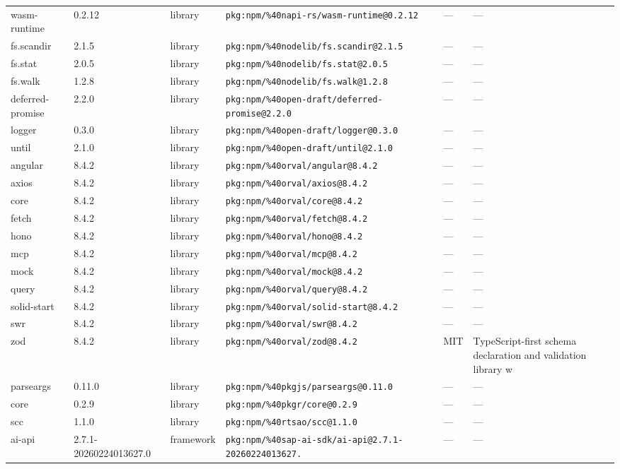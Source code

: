 \documentclass[11pt]{article}
\begin{document}
\begin{longtable}{|l|l|l|p{2.2cm}|l|p{4cm}|}
wasm-runtime & 0.2.12 & library & \texttt{pkg:npm/\%40napi-rs/wasm-runtime@0.2.12} & — & — \\
fs.scandir & 2.1.5 & library & \texttt{pkg:npm/\%40nodelib/fs.scandir@2.1.5} & — & — \\
fs.stat & 2.0.5 & library & \texttt{pkg:npm/\%40nodelib/fs.stat@2.0.5} & — & — \\
fs.walk & 1.2.8 & library & \texttt{pkg:npm/\%40nodelib/fs.walk@1.2.8} & — & — \\
deferred-promise & 2.2.0 & library & \texttt{pkg:npm/\%40open-draft/deferred-promise@2.2.0} & — & — \\
logger & 0.3.0 & library & \texttt{pkg:npm/\%40open-draft/logger@0.3.0} & — & — \\
until & 2.1.0 & library & \texttt{pkg:npm/\%40open-draft/until@2.1.0} & — & — \\
angular & 8.4.2 & library & \texttt{pkg:npm/\%40orval/angular@8.4.2} & — & — \\
axios & 8.4.2 & library & \texttt{pkg:npm/\%40orval/axios@8.4.2} & — & — \\
core & 8.4.2 & library & \texttt{pkg:npm/\%40orval/core@8.4.2} & — & — \\
fetch & 8.4.2 & library & \texttt{pkg:npm/\%40orval/fetch@8.4.2} & — & — \\
hono & 8.4.2 & library & \texttt{pkg:npm/\%40orval/hono@8.4.2} & — & — \\
mcp & 8.4.2 & library & \texttt{pkg:npm/\%40orval/mcp@8.4.2} & — & — \\
mock & 8.4.2 & library & \texttt{pkg:npm/\%40orval/mock@8.4.2} & — & — \\
query & 8.4.2 & library & \texttt{pkg:npm/\%40orval/query@8.4.2} & — & — \\
solid-start & 8.4.2 & library & \texttt{pkg:npm/\%40orval/solid-start@8.4.2} & — & — \\
swr & 8.4.2 & library & \texttt{pkg:npm/\%40orval/swr@8.4.2} & — & — \\
zod & 8.4.2 & library & \texttt{pkg:npm/\%40orval/zod@8.4.2} & MIT & TypeScript-first schema declaration and validation library w \\
parseargs & 0.11.0 & library & \texttt{pkg:npm/\%40pkgjs/parseargs@0.11.0} & — & — \\
core & 0.2.9 & library & \texttt{pkg:npm/\%40pkgr/core@0.2.9} & — & — \\
scc & 1.1.0 & library & \texttt{pkg:npm/\%40rtsao/scc@1.1.0} & — & — \\
ai-api & 2.7.1-20260224013627.0 & framework & \texttt{pkg:npm/\%40sap-ai-sdk/ai-api@2.7.1-20260224013627.} & — & — \\

\end{longtable}
\end{document}
